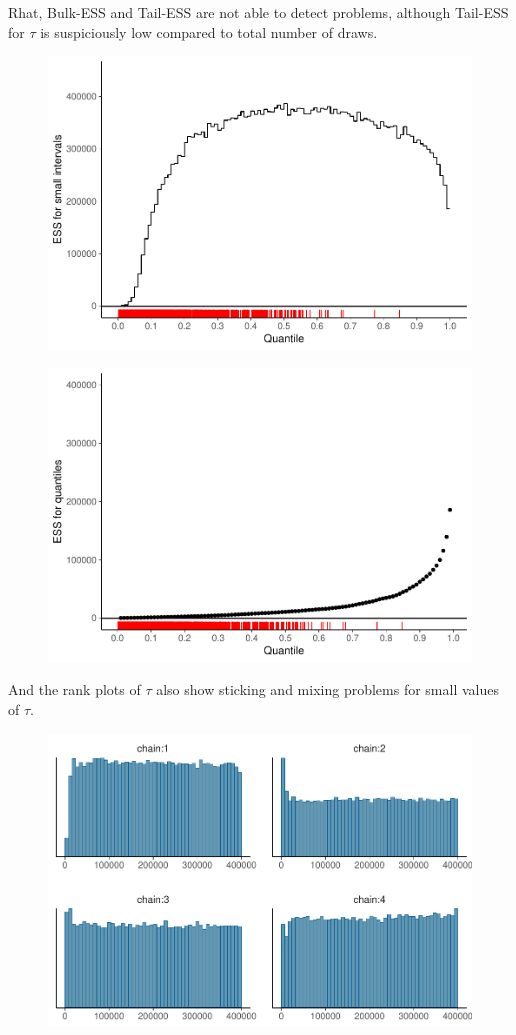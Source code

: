 \documentclass[american,]{article}
\begin{document}
Rhat, Bulk-ESS and Tail-ESS are not able to detect problems, although
Tail-ESS for $\tau$ is suspiciously low compared to total number
of draws.

\begin{figure}[tp]
  \centering
  \includegraphics[width=0.6\linewidth]{graphics/local-ess-fit-cp3-tau-1.pdf}
\end{figure}

\begin{figure}[tp]
  \centering
  \includegraphics[width=0.6\linewidth]{graphics/quantile-ess-fit-cp3-tau-1.pdf}
\end{figure}

And the rank plots of $\tau$ also show sticking and mixing
problems for small values of $\tau$.

\begin{figure}[tp]
  \centering
  \includegraphics[width=0.6\linewidth]{graphics/hist-fit-cp3-tau-1.pdf}
\end{figure}
\end{document}
